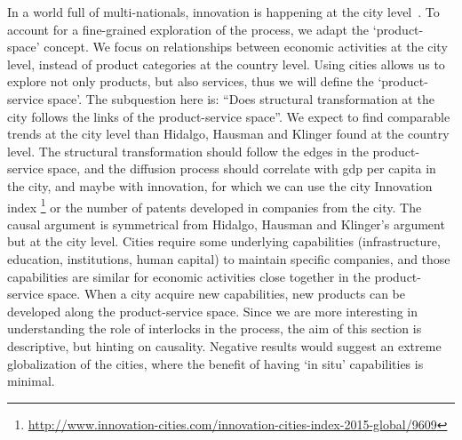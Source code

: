 In a world full of multi-nationals, innovation is happening at the city level~\citep{Belderbos2014}.
To account for a fine-grained exploration of the process, we adapt the `product-space' concept. 
We focus on relationships between economic activities at the city level,
instead of product categories at the country level.
Using cities allows us to explore not only products, but also services, thus we will define the `product-service space'. 
The subquestion here is: ``Does structural transformation at the city follows the links of the product-service space''.
We expect to find comparable trends at the city level than Hidalgo, Hausman and Klinger found at the country level.
The structural transformation should follow the edges in the product-service space, 
and the diffusion process should correlate with gdp per capita in the city, 
and maybe with innovation, for which we can use the city Innovation index \footnote{\url{http://www.innovation-cities.com/innovation-cities-index-2015-global/9609}}
or the number of patents developed in companies from the city.
The causal argument is symmetrical from Hidalgo, Hausman and Klinger's argument~\cite{hidalgo2007, hausmann2011, Hausmann2006,hidalgo2009} but at the city level.
Cities require some underlying capabilities (infrastructure, education, institutions, human capital) to maintain specific companies,
and those capabilities are similar for economic activities close together in the product-service space.
When a city acquire new capabilities, new products can be developed along the product-service space.
Since we are more interesting in understanding the role of interlocks in the process, 
the aim of this section is descriptive, 
but hinting on causality.
Negative results would suggest an extreme globalization of the cities, 
where the benefit of having `in situ' capabilities is minimal.




